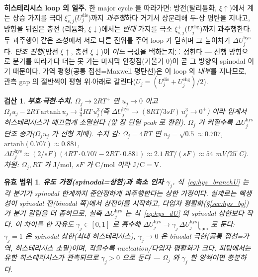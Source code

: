 \documentclass[11pt,a4paper]{article}
\newtheorem*{boundbox}{유효 범위}
\newtheorem*{verifybox}{검산}
\newcommand{\dis}{\mathrm{dis}}
\newcommand{\chg}{\mathrm{chg}}
\newcommand{\hys}{\mathrm{hys}}
\begin{document}
\textbf{히스테리시스 loop 의 일주.} 한 major cycle 을 따라가면: 방전(탈리튬화, $\xi\uparrow$)에서 계는 상승 가지를
극대 $\xi_{s,j}^-$($U_j^\dis$)까지 \emph{과주행}하다 거기서 상분리해 두-상 평탄을 지나고, 방향을 뒤집은 충전
(리튬화, $\xi\downarrow$)에서는 \emph{반대} 가지를 극소 $\xi_{s,j}^+$($U_j^\chg$)까지 과주행한다. 두 과주행이 같은
조성에서 서로 다른 전위를 주어 loop 가 닫히며 그 높이차가 $\Delta U_j^\hys$ 다. \emph{단조 진행}(방전 $\xi\uparrow$,
충전 $\xi\downarrow$)이 \emph{어느} 극값을 택하는지를 정한다 — 진행 방향으로 분기를 따라가다 더는 못 가는 마지막
안정점(기울기 $0$)이 곧 그 방향의 spinodal 이기 때문이다. 가역 평형(공통 접선=Maxwell 평탄선)은 이 loop 의
\emph{내부}를 지나므로, 관측 gap 의 절반씩이 평형 위$\cdot$아래로 갈린다($U_j=(U_j^\dis+U_j^\chg)/2$).
\begin{verifybox}
\textbf{부호$\cdot$극한$\cdot$수치.} $\Omega_j\to2RT^+$ 면 $u_j\to0$ 이고 $\Omega_j u_j-2RT\,\mathrm{artanh}\,u_j
\to\tfrac43RT\,u_j^3$(즉 $\Delta U_j^\hys\to(8RT/3sF)\,u_j^3\to0^+$) 이라 임계서 히스테리시스가 매끄럽게 소멸한다
(앞 장 단일 peak 로 환원). $\Omega_j$ 가 커질수록 $\Delta U_j^\hys$ 단조 증가($\Omega_j u_j$ 가 선형 지배).
수치 감: $\Omega_j=4RT$ 면 $u_j=\sqrt{0.5}\approx0.707$, $\mathrm{artanh}(0.707)\approx0.881$, $\Delta U_j^\hys
\approx(2/sF)(4RT\cdot0.707-2RT\cdot0.881)\approx2.1\,RT/(sF)\approx54$ mV($25^\circ$C). 차원: $\Omega_j,RT$ 가
$\mathrm{J/mol}$, $sF$ 가 $\mathrm{C/mol}$ 이라 $\mathrm{J/C}=\mathrm V$.
\end{verifybox}
\begin{boundbox}
\textbf{유도 가정(spinodal=상한)과 축소 인자 $\gamma_j$.} 식~\eqref{eq:hys_branchU} 는 각 분기가 \emph{spinodal
한계}까지 준안정하게 과주행한다는 \emph{상한} 가정이다. 실제로는 핵생성이 spinodal 전(binodal 쪽)에서 상전이를
시작하고, 다입자 평활화(\S\ref{sec:hys_bg})가 분기 갈림을 더 좁히므로, 실측 $\Delta U_j^\hys$ 는 식~\eqref{eq:hys_dU}
의 spinodal 상한보다 작다. 이 차이를 한 자유도 $\gamma_j\in[0,1]$ 로 흡수해 $\Delta U_j^\hys\to\gamma_j\,
\Delta U_j^\hys|_\mathrm{spin}$ 로 둔다: $\gamma_j=1$ 은 spinodal 상한(최대 히스테리시스), $\gamma_j\to0$ 은 binodal
극한(공통 접선=가역, 히스테리시스 소멸)이며, 작을수록 nucleation/다입자 평활화가 크다. 피팅에서는 유한
히스테리시스가 관측되므로 $\gamma_j>0$ 으로 둔다 — $\Omega_j$ 와 $\gamma_j$ 한 양씩이면 충분하다.
\end{boundbox}

\end{document}
